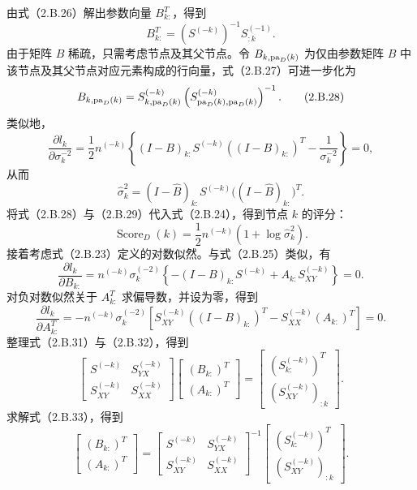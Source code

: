 由式（2.B.26）解出参数向量 $B_{k:}^T$，得到
\begin{equation}
B_{k:}^T=(S^{(-k)})^{-1}S_{:k}^{(-1)}.\tag{2.B.27}
\end{equation}
由于矩阵 $B$ 稀疏，只需考虑节点及其父节点。令 $B_{k,\mathrm{pa}_D(k)}$ 为仅由参数矩阵 $B$ 中该节点及其父节点对应元素构成的行向量，式（2.B.27）可进一步化为
\begin{equation}
B_{k,\mathrm{pa}_D(k)}
 =S_{k,\mathrm{pa}_D(k)}^{(-k)}
  \left(S_{\mathrm{pa}_D(k),\mathrm{pa}_D(k)}^{(-k)}\right)^{-1}.\tag{2.B.28}
\end{equation}
类似地，
\[
\frac{\partial l_k}{\partial\sigma_k^{-2}}
 =\frac12n^{(-k)}
 \left\{(I-B)_{k:}S^{(-k)}((I-B)_{k:})^T
       -\frac1{\sigma_k^{-2}}\right\}=0,
\]
从而
\begin{equation}
\widehat\sigma_k^2=(I-\widehat B)_{k:}S^{(-k)}
 \bigl((I-\widehat B)_{k:}\bigr)^T.\tag{2.B.29}
\end{equation}
将式（2.B.28）与（2.B.29）代入式（2.B.24），得到节点 $k$ 的评分：
\begin{equation}
\operatorname{Score}_D(k)=\frac12n^{(-k)}
 (1+\log\widehat\sigma_k^2).\tag{2.B.30}
\end{equation}
接着考虑式（2.B.23）定义的对数似然。与式（2.B.25）类似，有
\begin{equation}
\frac{\partial l_k}{\partial B_{k:}}
 =n^{(-k)}\sigma_k^{(-2)}
 \left\{-(I-B)_{k:}S^{(-k)}+A_{k:}S_{XY}^{(-k)}\right\}=0.\tag{2.B.31}
\end{equation}
对负对数似然关于 $A_{k:}^T$ 求偏导数，并设为零，得到
\begin{equation}
\frac{\partial l_k}{\partial A_{k:}^T}
 =-n^{(-k)}\sigma_k^{(-2)}
 \left[S_{XY}^{(-k)}((I-B)_{k:})^T
       -S_{XX}^{(-k)}(A_{k:})^T\right]=0.\tag{2.B.32}
\end{equation}
整理式（2.B.31）与（2.B.32），得到
\begin{equation}
\begin{bmatrix}
S^{(-k)}&S_{YX}^{(-k)}\\
S_{XY}^{(-k)}&S_{XX}^{(-k)}
\end{bmatrix}
\begin{bmatrix}(B_{k:})^T\\(A_{k:})^T\end{bmatrix}
=\begin{bmatrix}
(S_{k:}^{(-k)})^T\\
(S_{XY}^{(-k)})_{:k}
\end{bmatrix}.\tag{2.B.33}
\end{equation}
求解式（2.B.33），得到
\begin{equation}
\begin{bmatrix}(B_{k:})^T\\(A_{k:})^T\end{bmatrix}
=\begin{bmatrix}
S^{(-k)}&S_{YX}^{(-k)}\\
S_{XY}^{(-k)}&S_{XX}^{(-k)}
\end{bmatrix}^{-1}
\begin{bmatrix}
(S_{k:}^{(-k)})^T\\
(S_{XY}^{(-k)})_{:k}
\end{bmatrix}.\tag{2.B.34}
\end{equation}
